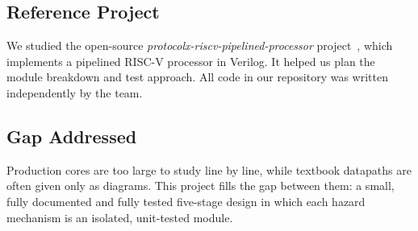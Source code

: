 \subsection{Reference Project}
We studied the open-source \emph{protocolx-riscv-pipelined-processor}
project~\cite{protocolx}, which implements a pipelined RISC-V processor in Verilog. It
helped us plan the module breakdown and test approach. All code in our repository was
written independently by the team.

\subsection{Gap Addressed}
Production cores are too large to study line by line, while textbook datapaths are
often given only as diagrams. This project fills the gap between them: a small, fully
documented and fully tested five-stage design in which each hazard mechanism is an
isolated, unit-tested module.

